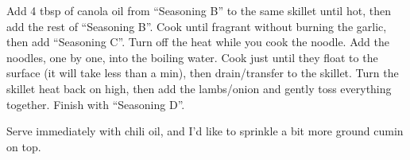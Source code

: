 \documentclass[
]{article}
\begin{document}
Add 4 tbsp of canola oil from ``Seasoning B'' to the same skillet until hot, then add the rest of ``Seasoning B''. Cook until fragrant without burning the garlic, then add ``Seasoning C''. Turn off the heat while you cook the noodle. Add the noodles, one by one, into the boiling water. Cook just until they float to the surface (it will take less than a min), then drain/transfer to the skillet. Turn the skillet heat back on high, then add the lambs/onion and gently toss everything together. Finish with ``Seasoning D''.

Serve immediately with chili oil, and I'd like to sprinkle a bit more ground cumin on top.

  

\printindex
\end{document}
